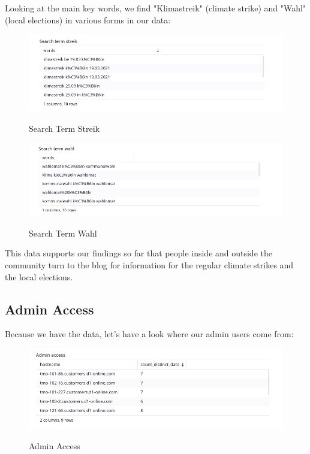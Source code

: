Looking at the main key words, we find "Klimastreik" (climate strike) and "Wahl" (local elections) in various forms in our data:

\begin{figure}[H]
\centering
\caption {Search Term Streik}
\includegraphics[width=\linewidth]{images/figure04.png}
\label{fig:searchStreik}
\end{figure}

\begin{figure}[H]
\centering
\caption {Search Term Wahl}
\includegraphics[width=\linewidth]{images/figure05.png}
\label{fig:searchWahl}
\end{figure}

This data supports our findings so far that people inside and outside the community turn to the blog for information for the regular climate strikes and the local elections.

\subsection{Admin Access}

Because we have the data, let's have a look where our admin users come from:

\begin{figure}[H]
\centering
\caption {Admin Access}
\includegraphics[width=\linewidth]{images/figure06.png}
\label{fig:adminAccess}
\end{figure}

